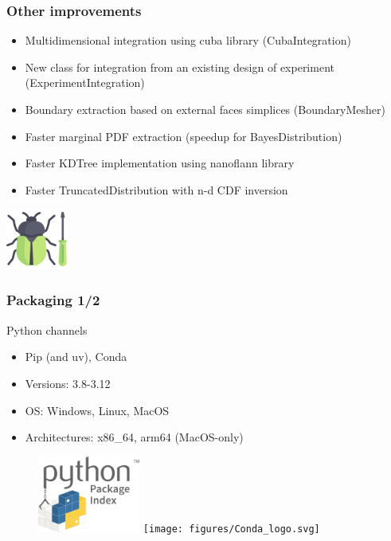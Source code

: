 \documentclass[aspectratio=169]{beamer}
\begin{document}
\begin{frame}
\frametitle{Other improvements}
\begin{itemize}
\item Multidimensional integration using cuba library (CubaIntegration)
\item New class for integration from an existing design of experiment (ExperimentIntegration)
\item Boundary extraction based on external faces simplices (BoundaryMesher)
\item Faster marginal PDF extraction (speedup for BayesDistribution)
\item Faster KDTree implementation using nanoflann library
\item Faster TruncatedDistribution with n-d CDF inversion
\end{itemize}

\vspace{6pt}

\begin{center}
\includegraphics[width=0.15\textwidth]{figures/bugfix}
\end{center}

\end{frame}


\begin{frame}
\frametitle{Packaging 1/2}
\begin{block}{Python channels}
\begin{itemize}
\item Pip (and uv), Conda
\item Versions: 3.8-3.12
\item OS: Windows, Linux, MacOS
\item Architectures: x86\_64, arm64 (MacOS-only)
\end{itemize}
\end{block}

\begin{figure}
   \includegraphics[width=0.3\textwidth]{figures/PyPI_logo}
   \texttt{[image: figures/Conda\_logo.svg]}
\end{figure}

\end{frame}
\end{document}
